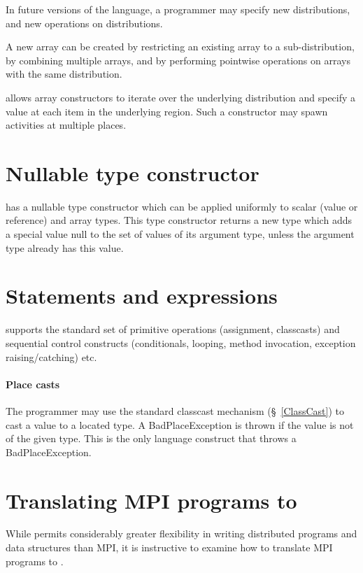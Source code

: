 In future versions of the language, a programmer may specify new
distributions, and new operations on distributions.

A new array can be created by restricting an existing array to a
sub-distribution, by combining multiple arrays, and by performing
pointwise operations on arrays with the same distribution.

\Xten{} allows array constructors to iterate over the underlying
distribution and specify a value at each item in the underlying
region. Such a constructor may spawn activities at multiple places.


\section{Nullable type constructor}

\Xten{} has a {\cf nullable} type constructor which can be applied uniformly to
scalar (value or reference) and array types. This type constructor
returns a new type which adds a special value {\cf null} to the set of
values of its argument type, unless the argument type already has this
value.

\section{Statements and expressions}
\Xten{} supports the standard set of primitive operations (assignment, classcasts) and sequential control constructs (conditionals, looping, method
invocation, exception raising/catching) etc.

\paragraph{Place casts}
The programmer may use the standard classcast mechanism
(\S~\ref{ClassCast}) to cast a value to a located type. A {\cf
BadPlaceException} is thrown if the value is not of the given
type. This is the only language construct that throws a {\cf
BadPlaceException}.

\section{Translating MPI programs to \Xten{}}

While \Xten{} permits considerably greater flexibility in writing
distributed programs and data structures than MPI, it is instructive
to examine how to translate MPI programs to \Xten.

